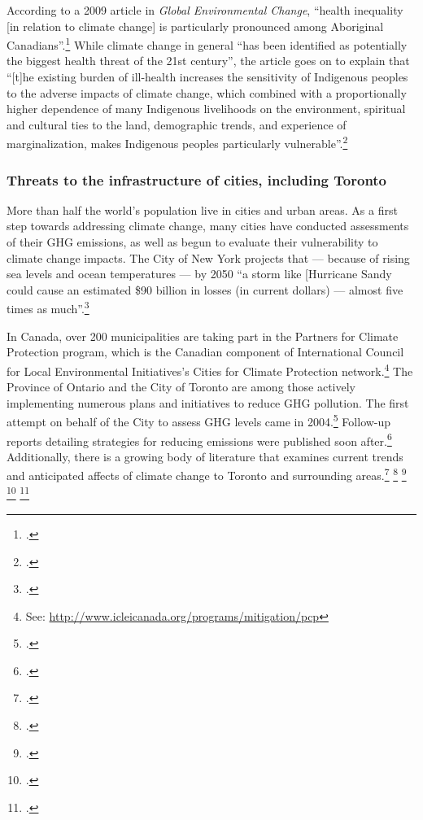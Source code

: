 According to a 2009 article in \emph{Global Environmental Change}, ``health inequality [in relation to climate change] is
particularly pronounced among Aboriginal Canadians''.\footcite[][p. 1]{VulAborig2009}
While climate change in general ``has been identified as potentially the biggest health threat of the 21st century'', the article goes on to explain that ``[t]he existing burden of ill-health increases the sensitivity of Indigenous peoples to the adverse impacts of climate change, which combined with a proportionally higher dependence of many Indigenous livelihoods on the environment, spiritual and cultural ties to the land, demographic trends, and experience of marginalization, makes Indigenous peoples particularly vulnerable''.\footcite[][p. 1]{VulAborig2009}



	\subsubsection{Threats to the infrastructure of cities, including Toronto}



More than half the world's population live in cities and urban areas. 
As a first step towards addressing climate change, many cities have conducted assessments of their GHG emissions, as well as begun to evaluate their vulnerability to climate change impacts.
The City of New York projects that --- because of rising sea levels and ocean temperatures --- by 2050 ``a storm like [Hurricane Sandy could cause an estimated \$90 billion in losses (in current dollars) --- almost five times as much''.\footcite[][Foreward, p. 2]{ResilientNewYork}



In Canada, over 200 municipalities are taking part in the Partners for Climate Protection  program, which is the Canadian component of International Council for Local Environmental Initiatives's Cities for Climate Protection network.\footnote{See: \url{http://www.icleicanada.org/programs/mitigation/pcp}}
The Province of Ontario and the City of Toronto are among those actively implementing numerous plans and initiatives to reduce GHG pollution. 
The first attempt on behalf of the City to assess GHG levels came in 2004.\footcite[][p. IV]{GHGPollutionToronto}
Follow-up reports detailing strategies for reducing emissions were published soon after.\footcite[][]{CCAHealthEquity}
Additionally, there is a growing body of literature that examines current trends and anticipated affects of climate change to Toronto and surrounding areas.\footcite[][]{TorontoEnvOff2007} \footcite[][]{TorontoAheadStorm} \footcite[][]{ScanCCToronto} \footcite[][]{AdaptPrioritiesCanada} \footcite[][]{MacLeodAdaptation}



